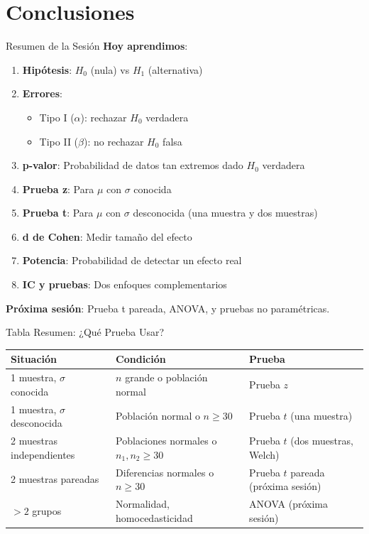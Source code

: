 \documentclass[aspectratio=169, 11pt]{beamer}
\begin{document}
\section{Conclusiones}

\begin{frame}{Resumen de la Sesión}
\textbf{Hoy aprendimos}:
\begin{enumerate}
  \item \textbf{Hipótesis}: $H_0$ (nula) vs $H_1$ (alternativa)
  \item \textbf{Errores}:
  \begin{itemize}
    \item Tipo I ($\alpha$): rechazar $H_0$ verdadera
    \item Tipo II ($\beta$): no rechazar $H_0$ falsa
  \end{itemize}
  \item \textbf{p-valor}: Probabilidad de datos tan extremos dado $H_0$ verdadera
  \item \textbf{Prueba z}: Para $\mu$ con $\sigma$ conocida
  \item \textbf{Prueba t}: Para $\mu$ con $\sigma$ desconocida (una muestra y dos muestras)
  \item \textbf{d de Cohen}: Medir tamaño del efecto
  \item \textbf{Potencia}: Probabilidad de detectar un efecto real
  \item \textbf{IC y pruebas}: Dos enfoques complementarios
\end{enumerate}

\vspace{0.3cm}
\textbf{Próxima sesión}: Prueba t pareada, ANOVA, y pruebas no paramétricas.
\end{frame}

\begin{frame}{Tabla Resumen: ¿Qué Prueba Usar?}
\begin{table}
\centering
\footnotesize
\begin{tabular}{p{3cm}p{2.5cm}p{4cm}}
\toprule
\textbf{Situación} & \textbf{Condición} & \textbf{Prueba} \\
\midrule
1 muestra, $\sigma$ conocida & $n$ grande o población normal & Prueba $z$ \\[0.2cm]
1 muestra, $\sigma$ desconocida & Población normal o $n \geq 30$ & Prueba $t$ (una muestra) \\[0.2cm]
2 muestras independientes & Poblaciones normales o $n_1, n_2 \geq 30$ & Prueba $t$ (dos muestras, Welch) \\[0.2cm]
2 muestras pareadas & Diferencias normales o $n \geq 30$ & Prueba $t$ pareada (próxima sesión) \\[0.2cm]
$> 2$ grupos & Normalidad, homocedasticidad & ANOVA (próxima sesión) \\
\bottomrule
\end{tabular}
\end{table}
\end{frame}
\end{document}
